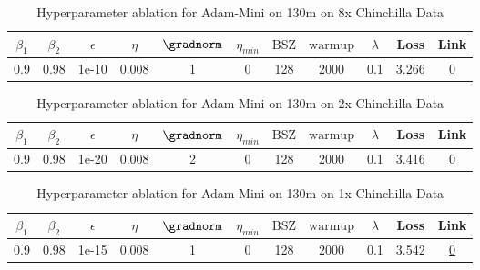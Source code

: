 \begin{table}[H]
\centering
\caption{Hyperparameter ablation for Adam-Mini on 130m on 8x Chinchilla Data}
\label{tab:ablation_adam-mini_130m_8}
\begin{tabular}{ccccccccccc}
\toprule
$\beta_1$ & $\beta_2$ & $\epsilon$ & $\eta$ & $\gradnorm$ & $\eta_{min}$ & $\mathrm{BSZ}$ & $\mathrm{warmup}$ & $\lambda$ & Loss & Link \\
\midrule
0.9 & 0.98 & 1e-10 & 0.008 & 1 & 0 & 128 & 2000 & 0.1 & 3.266 & \href{https://wandb.ai/stanford-mercury/optimizer-scaling/runs/sweep-130m-21B-miniac2e1elr0.008-wd0.1-minlr0-warmup2000-b10.9-b-d489dc}{0} \\
\midrule
\bottomrule
\end{tabular}
\end{table}

\begin{table}[H]
\centering
\caption{Hyperparameter ablation for Adam-Mini on 130m on 2x Chinchilla Data}
\label{tab:ablation_adam-mini_130m_2}
\begin{tabular}{ccccccccccc}
\toprule
$\beta_1$ & $\beta_2$ & $\epsilon$ & $\eta$ & $\gradnorm$ & $\eta_{min}$ & $\mathrm{BSZ}$ & $\mathrm{warmup}$ & $\lambda$ & Loss & Link \\
\midrule
0.9 & 0.98 & 1e-20 & 0.008 & 2 & 0 & 128 & 2000 & 0.1 & 3.416 & \href{https://wandb.ai/stanford-mercury/optimizer-scaling/runs/sweep-130m-5B-mini609ad2lr0.008-wd0.1-minlr0-warmup2000-b10.9-b2-b557c0}{0} \\
\midrule
\bottomrule
\end{tabular}
\end{table}

\begin{table}[H]
\centering
\caption{Hyperparameter ablation for Adam-Mini on 130m on 1x Chinchilla Data}
\label{tab:ablation_adam-mini_130m_1}
\begin{tabular}{ccccccccccc}
\toprule
$\beta_1$ & $\beta_2$ & $\epsilon$ & $\eta$ & $\gradnorm$ & $\eta_{min}$ & $\mathrm{BSZ}$ & $\mathrm{warmup}$ & $\lambda$ & Loss & Link \\
\midrule
0.9 & 0.98 & 1e-15 & 0.008 & 1 & 0 & 128 & 2000 & 0.1 & 3.542 & \href{https://wandb.ai/stanford-mercury/optimizer-scaling/runs/sweep-130m-2B-minif4e66flr0.008-wd0.1-minlr0-warmup2000-b10.9-b2-4d3c05}{0} \\
\midrule
\bottomrule
\end{tabular}
\end{table}

